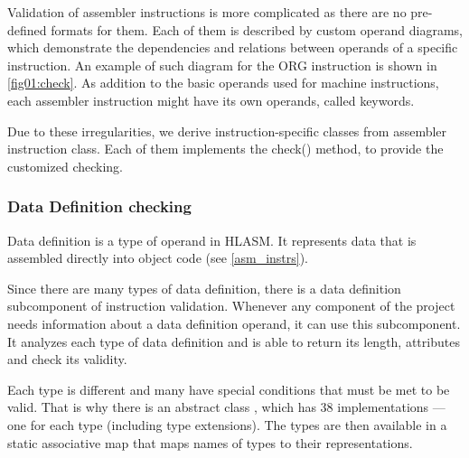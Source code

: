 Validation of assembler instructions is more complicated as there are no pre-defined formats for them. Each of them is described by custom operand diagrams, which demonstrate the dependencies and relations between operands of a specific instruction. An example of such diagram for the ORG instruction is shown in \cref{fig01:check}. As addition to the basic operands used for machine instructions, each assembler instruction might have its own operands, called keywords.

Due to these irregularities, we derive instruction-specific classes from assembler instruction class. Each of them implements the check() method, to provide the customized checking.

\subsubsection{Data Definition checking}

Data definition is a type of operand in HLASM. It represents data that is assembled directly into object code (see \cref{asm_instrs}).

Since there are many types of data definition, there is a data definition subcomponent of instruction validation. Whenever any component of the project needs information about a data definition operand, it can use this subcomponent. It analyzes each type of data definition and is able to return its length, attributes and check its validity.

Each type is different and many have special conditions that must be met to be valid. That is why there is an abstract class , which has 38 implementations --- one for each type (including type extensions). The types are then available in a static associative map that maps names of types to their representations.

